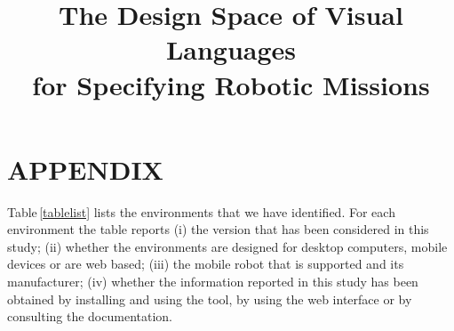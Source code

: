 \documentclass[sigplan,anonymous]{acmart} %
\newcommand\tb[1]{\nb{Thorsten}{#1}}
\newcommand{\tabref}[1]{Table\,\ref{#1}}
\begin{document}
\title{The Design Space of Visual Languages\\for Specifying Robotic Missions}

\renewcommand{\shorttitle}{Design Space of Visual Languages for Specifying Robotic Missions}

\maketitle










%






\section*{APPENDIX}

\tabref{tablelist} lists the environments that we have identified.
For each environment the table reports  
(i) the version that has been considered in this study;
(ii) whether the environments are designed for desktop computers,
mobile devices or are web based;
(iii) the mobile robot that is supported and its manufacturer;
(iv) whether the information reported in this study has been obtained by installing and using the tool, by using the web interface or by consulting the documentation.







\clearpage

\end{document}
